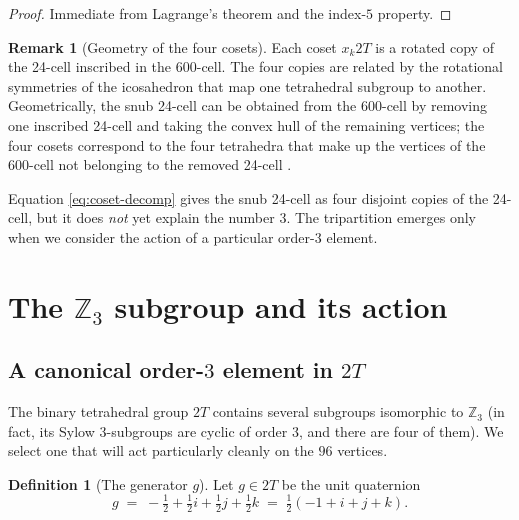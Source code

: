 \documentclass[10pt,reqno]{amsart}
\theoremstyle{plain}
\theoremstyle{definition}
\newtheorem{definition}[theorem]{Definition}
\newtheorem{remark}[theorem]{Remark}
\begin{document}
\begin{proof}
Immediate from Lagrange's theorem and the index-$5$ property.
\end{proof}

\begin{remark}[Geometry of the four cosets]
Each coset $x_k 2T$ is a rotated copy of the 24-cell inscribed in the 600-cell. The four copies are related by the rotational symmetries of the icosahedron that map one tetrahedral subgroup to another. Geometrically, the snub 24-cell can be obtained from the 600-cell by removing one inscribed 24-cell and taking the convex hull of the remaining vertices; the four cosets correspond to the four tetrahedra that make up the vertices of the 600-cell not belonging to the removed 24-cell \cite{SadocMosseri1989,Onoda1987}.
\end{remark}

Equation \eqref{eq:coset-decomp} gives the snub 24-cell as four disjoint copies of the 24-cell, but it does \emph{not} yet explain the number $3$. The tripartition emerges only when we consider the action of a particular order-$3$ element.

\section{The $\mathbb{Z}_3$ subgroup and its action}\label{sec:z3}

\subsection{A canonical order-$3$ element in $2T$}

The binary tetrahedral group $2T$ contains several subgroups isomorphic to $\mathbb{Z}_3$ (in fact, its Sylow $3$-subgroups are cyclic of order $3$, and there are four of them). We select one that will act particularly cleanly on the $96$ vertices.

\begin{definition}[The generator $g$]\label{def:g}
Let $g \in 2T$ be the unit quaternion
\begin{equation}\label{eq:g-def}
g \;=\; -\tfrac12 + \tfrac12 i + \tfrac12 j + \tfrac12 k
\;=\; \tfrac12(-1 + i + j + k).
\end{equation}
\end{definition}
\end{document}
